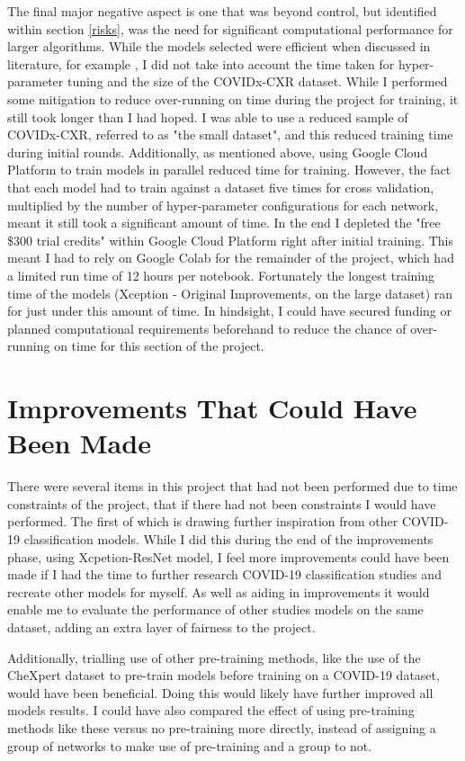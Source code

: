 The final major negative aspect is one that was beyond control, but identified within section \ref{risks}, was the need for significant computational performance for larger algorithms. While the models selected were efficient when discussed in literature, for example \cite{KerasApp92:online}, I did not take into account the time taken for hyper-parameter tuning and the size of the COVIDx-CXR dataset. While I performed some mitigation to reduce over-running on time during the project for training, it still took longer than I had hoped. I was able to use a reduced sample of COVIDx-CXR, referred to as "the small dataset", and this reduced training time during initial rounds. Additionally, as mentioned above, using Google Cloud Platform to train models in parallel reduced time for training. However, the fact that each model had to train against a dataset five times for cross validation, multiplied by the number of hyper-parameter configurations for each network, meant it still took a significant amount of time. In the end I depleted the "free \$300 trial credits" within Google Cloud Platform right after initial training. This meant I had to rely on Google Colab for the remainder of the project, which had a limited run time of 12 hours per notebook. Fortunately the longest training time of the models (Xception - Original Improvements, on the large dataset) ran for just under this amount of time. In hindsight, I could have secured funding or planned computational requirements beforehand to reduce the chance of over-running on time for this section of the project.

\section{Improvements That Could Have Been Made}
There were several items in this project that had not been performed due to time constraints of the project, that if there had not been constraints I would have performed. The first of which is drawing further inspiration from other COVID-19 classification models. While I did this during the end of the improvements phase, using \cite{fitriasari2021improvement} Xcpetion-ResNet model, I feel more improvements could have been made if I had the time to further research COVID-19 classification studies and recreate other models for myself. As well as aiding in improvements it would enable me to evaluate the performance of other studies models on the same dataset, adding an extra layer of fairness to the project.

Additionally, trialling use of other pre-training methods, like the \cite{bressem2020comparing} use of the CheXpert dataset to pre-train models before training on a COVID-19 dataset, would have been beneficial. Doing this would likely have further improved all models results. I could have also compared the effect of using pre-training methods like these versus no pre-training more directly, instead of assigning a group of networks to make use of pre-training and a group to not.

